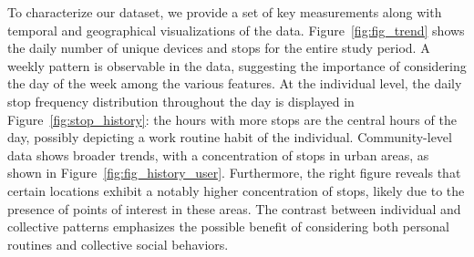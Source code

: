 \documentclass{article}
\begin{document}
To characterize our dataset, we provide a set of key measurements along with temporal and geographical visualizations of the data.
Figure~\ref{fig:fig_trend} shows the daily number of unique devices and stops for the entire study period.
A weekly pattern is observable in the data, suggesting the importance of considering the day of the week among the various features.
At the individual level, the daily stop frequency distribution throughout the day is displayed in Figure~\ref{fig:stop_history}: the hours with more stops are the central hours of the day, possibly depicting a work routine habit of the individual.
Community-level data shows broader trends, with a concentration of stops in urban areas, as shown in Figure~\ref{fig:fig_history_user}. Furthermore, the right figure reveals that certain locations exhibit a notably higher concentration of stops, likely due to the presence of points of interest in these areas. The contrast between individual and collective patterns emphasizes the possible benefit of considering both personal routines and collective social behaviors.
\end{document}
